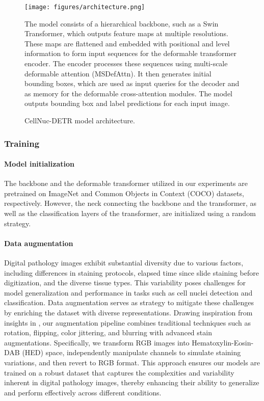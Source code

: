\begin{figure}
    \centering
    \texttt{[image: figures/architecture.png]}
    \caption{CellNuc-DETR model architecture.}
    \label{fig:architecture}
    \footnotesize{The model consists of a hierarchical backbone, such as a Swin Transformer, which outputs feature maps at multiple resolutions. These maps are flattened and embedded with positional and level information to form input sequences for the deformable transformer encoder. The encoder processes these sequences using multi-scale deformable attention (MSDefAttn). It then generates initial bounding boxes, which are used as input queries for the decoder and as memory for the deformable cross-attention modules. The model outputs bounding box and label predictions for each input image.}
\end{figure}

\subsubsection{Training}
\label{sec:methods:CellNuc-DETR:training}

\paragraph{Model initialization}
The backbone and the deformable transformer utilized in our experiments are pretrained on ImageNet \cite{deng2009imagenet} and Common Objects in Context (COCO) \cite{lin2014microsoft} datasets, respectively. However, the neck connecting the backbone and the transformer, as well as the classification layers of the transformer, are initialized using a random strategy.

\paragraph{Data augmentation}
Digital pathology images exhibit substantial diversity due to various factors, including differences in staining protocols, elapsed time since slide staining before digitization, and the diverse tissue types. This variability poses challenges for model generalization and performance in tasks such as cell nuclei detection and classification. Data augmentation serves as strategy to mitigate these challenges by enriching the dataset with diverse representations. Drawing inspiration from insights in \cite{10.1117/12.2293048}, our augmentation pipeline combines traditional techniques such as rotation, flipping, color jittering, and blurring with advanced stain augmentations. Specifically, we transform RGB images into Hematoxylin-Eosin-DAB (HED) space, independently manipulate channels to simulate staining variations, and then revert to RGB format. This approach ensures our models are trained on a robust dataset that captures the complexities and variability inherent in digital pathology images, thereby enhancing their ability to generalize and perform effectively across different conditions.

